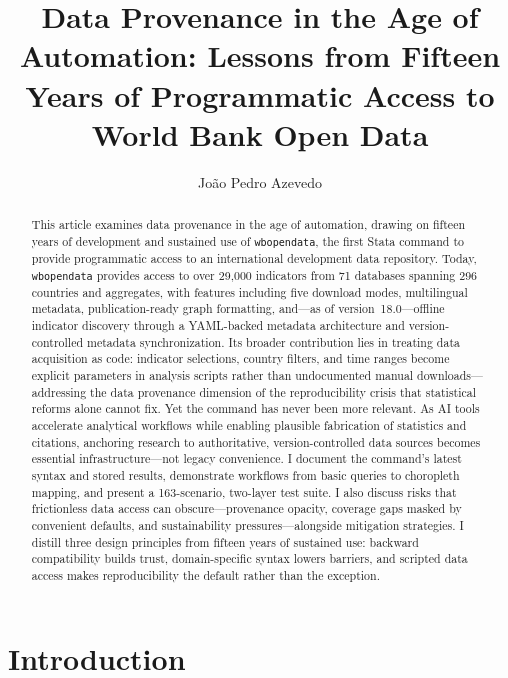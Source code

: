 \documentclass[bib]{statapress}
\title[Data Provenance in the Age of Automation]{Data Provenance in the Age of Automation: Lessons from Fifteen Years of Programmatic Access to World Bank Open Data}
\author{Jo\~{a}o Pedro Azevedo}{%
Jo\~{a}o Pedro Azevedo\\
jpazvd.github.io%
}
\begin{document}
\maketitle

\begin{abstract}
This article examines data provenance in the age of automation, drawing on fifteen years of development and sustained use of \texttt{wbopendata}, the first Stata command to provide programmatic access to an international development data
repository. Today, \texttt{wbopendata} provides access to over 29{,}000 indicators from 71 databases spanning 296 countries and aggregates, with features including five download modes, multilingual metadata, publication-ready graph formatting, and---as of version~18.0---offline indicator discovery through a YAML-backed metadata architecture and version-controlled metadata synchronization. Its broader contribution lies in treating data acquisition as code: indicator selections, country filters, and time ranges become explicit parameters in analysis scripts rather than undocumented manual downloads---addressing the data provenance dimension of the reproducibility crisis that statistical reforms alone cannot fix. Yet the command has never been more relevant. As AI tools accelerate analytical workflows while enabling plausible fabrication of statistics and citations, anchoring research to authoritative, version-controlled data sources becomes essential infrastructure---not legacy convenience. I document the command's latest syntax and stored results, demonstrate workflows from basic queries to choropleth mapping, and present a 163-scenario, two-layer test suite. I also discuss risks that frictionless data access can obscure---provenance opacity, coverage gaps masked by convenient defaults, and sustainability pressures---alongside mitigation strategies. I distill three design principles from fifteen years of sustained use: backward compatibility builds trust, domain-specific syntax lowers barriers, and scripted data access makes reproducibility the default rather than the exception.

\end{abstract}


\section{Introduction}\label{sec:intro}
\end{document}
